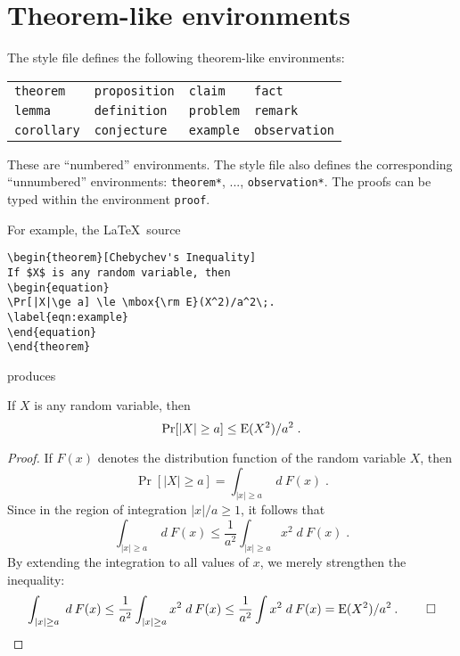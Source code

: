 \section{Theorem-like environments}

The style file defines the following theorem-like environments:
\begin{center}
\begin{tabular}{llll}
\verb|theorem|	& \verb|proposition|	& \verb|claim|	& \verb|fact| \\

\verb|lemma|	& \verb|definition|	& \verb|problem|& \verb|remark| \\

\verb|corollary|& \verb|conjecture|	& \verb|example|&  \verb|observation|
\end{tabular}
\end{center}
These are ``numbered'' environments.
The style file also defines the corresponding ``unnumbered''
environments: \verb|theorem*|, ..., \verb|observation*|.
The proofs can be typed within the environment \verb|proof|.

For example, the \LaTeX\ source
\begin{verbatim}
\begin{theorem}[Chebychev's Inequality]
If $X$ is any random variable, then
\begin{equation}
\Pr[|X|\ge a] \le \mbox{\rm E}(X^2)/a^2\;.
\label{eqn:example}
\end{equation}
\end{theorem}
\end{verbatim}
produces
\begin{theorem}
If $X$ is any random variable, then
\begin{equation}
\Pr[|X|\ge a] \le \mbox{\rm E}(X^2)/a^2\;.
\label{eqn:example}
\end{equation}
\end{theorem}


\begin{proof}
If $F(x)$ denotes the distribution function of the random variable $X$,
then
\[
\Pr[|X|\ge a] = \int_{|x|\ge a} \;d\:F(x)\;.
\]
Since in the region of integration $|x|/a\ge1$, it follows that
\[
\int_{|x|\ge a} \;d\:F(x) \le \frac{1}{a^2}
\int_{|x|\ge a} x^2\;d\:F(x)\;.
\]
By extending the integration to all values of $x$,
we merely strengthen the inequality:
\[
\int_{|x|\ge a} \;d\:F(x) \le
\frac{1}{a^2} \int_{|x|\ge a} x^2\;d\:F(x) \le
\frac{1}{a^2} \int x^2\;d\:F(x) = 
\mbox{\rm E}(X^2)/a^2\:.\; \qed
\]

\end{proof}

